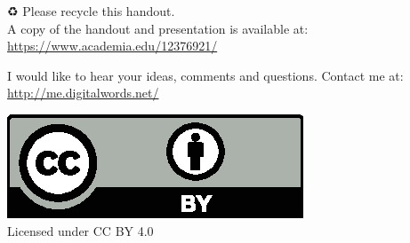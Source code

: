 %
%


\renewcommand{\bibnumberformat}[1]{#1.}
\renewcommand{\biblnfont}{\textscbf}
\renewcommand{\bibfnfont}{\textbf}
\renewcommand{\bibelnfont}{\textscbf}
\renewcommand{\bibefnfont}{\textbf}

%

\vfill

\begin{center}
\begin{extra}
	{♻} Please recycle this handout.\\A copy of the handout and presentation is available at:\\
	\url{https://www.academia.edu/12376921/}

	I would like to hear your ideas, comments and questions. Contact me at:\\
	\url{http://me.digitalwords.net/}

	\includegraphics[width=0.20\linewidth]{cc-by.eps}\\
	Licensed under CC BY 4.0
\end{extra}
\end{center}
